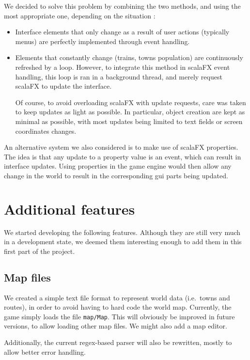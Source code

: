 \documentclass{article}
\begin{document}
We decided to solve this problem by combining the two methods, 
and using the most appropriate one, depending on the situation :
\begin{itemize}
\item Interface elements that only change as a result of user actions (typically menus) 
are perfectly implemented through event handling.

\item Elements that constantly change (trains, towns population) are continuously refreshed by a loop.
However, to integrate this method in scalaFX event handling, this loop is ran in a background thread,
and merely request scalaFX to update the interface.

Of course, to avoid overloading scalaFX with update requests, care was taken to keep updates as light as possible.
In particular, object creation are kept as minimal as possible, with most updates being limited to text fields
or screen coordinates changes.
\end{itemize}

An alternative system we also considered is to make use of scalaFX properties.
The idea is that any update to a property value is an event, which can result in interface updates.
Using properties in the game engine would then allow any change in the world to result in the corresponding
gui parts being updated.


\section{Additional features}
We started developing the following features. Although they are still very much in a development state,
we deemed them interesting enough to add them in this first part of the project.

\subsection{Map files}
We created a simple text file format to represent world data (i.e.\ towns and routes), 
in order to avoid having to hard code the world map.
Currently, the game simply loads the file \verb|map/Map|.
This will obviously be improved in future versions, to allow loading other map files.
We might also add a map editor.

Additionally, the current regex-based parser will also be rewritten,
mostly to allow better error handling.
\end{document}
